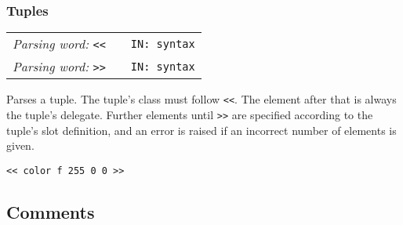 \documentclass{report}
\newcommand{\parsingword}[3]{\index{#1}
\emph{Parsing word:} \texttt{#2} &&\texttt{IN: #3}}
\newcommand{\wordtable}[1]{

\begin{tabularx}{12cm}[t]{lXr}
\hline
#1\\
\hline
\end{tabularx}

}
\begin{document}
\subsubsection{Tuples}
\newcommand{\tupleglos}{}
\tupleglos
\wordtable{
\parsingword{<<}{<<}{syntax}\\
\parsingword{>>}{>>}{syntax}
}
Parses a tuple. The tuple's class must follow \texttt{<<}. The element after that is always the tuple's delegate. Further elements until \texttt{>>} are specified according to the tuple's slot definition, and an error is raised if an incorrect number of elements is given.
\begin{verbatim}
<< color f 255 0 0 >>
\end{verbatim}

\subsection{\label{comments}Comments}
\end{document}
